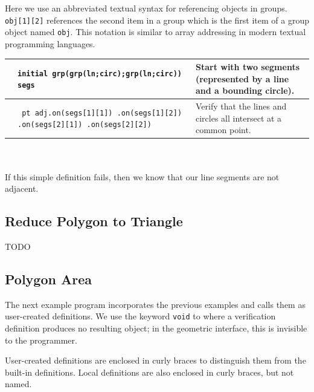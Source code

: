 \documentclass[twoside,11pt]{report}
\begin{document}
Here we use an abbreviated textual syntax for referencing objects in groups. 
{\tt obj[1][2]} references the second item in a group which is the first item of a group object named {\tt obj}. 
This notation is similar to array addressing in modern textual programming languages. \\

\noindent \begin{tabularx}{\textwidth}{l X p{4cm}}
\hspace{3.5cm}\vspace{1cm} & {\tt initial grp(grp(ln;circ);\newline grp(ln;circ)) segs } & {\small Start with two segments (represented by a line and a bounding circle). } \\
\hline
\vspace{0.5cm} & 
{\tt
pt adj.on(segs[1][1]) \newline
      .on(segs[1][2]) \newline
      .on(segs[2][1]) \newline
      .on(segs[2][2])
} & {\small Verify that the lines and circles all intersect at a common point.} \\
\end{tabularx}\\\\

If this simple definition fails, then we know that our line segments are not adjacent.

\subsection{Reduce Polygon to Triangle}
\label{subsec:reducepoly}

TODO

\subsection{Polygon Area}
\label{subsec:polyarea}

The next example program incorporates the previous examples and calls them as user-created definitions. 
We use the keyword {\tt void} to where a verification definition produces no resulting object; in the geometric interface, this is invisible to the programmer.

User-created definitions are enclosed in curly braces to distinguish them from the built-in definitions. 
Local definitions are also enclosed in curly braces, but not named. \\
\end{document}
